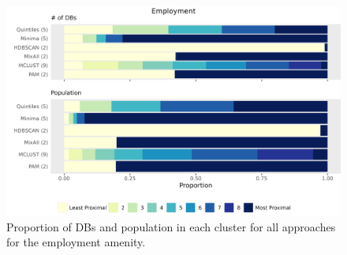 \documentclass[11pt, a4paper]{article}
\begin{document}
\begin{figure}[H]
\centering
\includegraphics[width=\textwidth]{./barplot_comparison/Employment_barplot.png}
\caption[Employment profile barplot]{Proportion of DBs and population in each cluster for all approaches for the employment amenity.}\label{employmentbarplot}
\end{figure}





\begin{table}[H]
\centering
\caption[Employment validation metrics]{The validation metric values for each clustering approach for the employment amenity.}\label{employmentvalid}
\end{table}
\end{document}
